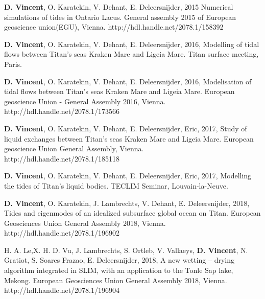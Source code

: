 \begin{list}{}{%
\setlength{\topsep}{0pt}%
\setlength{\leftmargin}{0.23in}%
\setlength{\listparindent}{-0.23in}%
\setlength{\itemindent}{-0.23in}%
\setlength{\parsep}{\parskip}%
}%

\item \textbf{D. Vincent}, O. Karatekin, V. Dehant, E. Deleersnijder, 2015 Numerical simulations of tides in Ontario Lacus. General assembly 2015 of European geoscience union(EGU), Vienna. http://hdl.handle.net/2078.1/158392

\item \textbf{D. Vincent}, O. Karatekin, V. Dehant, E. Deleersnijder, 2016, Modelling of tidal flows between Titan's seas Kraken Mare and Ligeia Mare. Titan surface meeting, Paris.

\item \textbf{D. Vincent}, O. Karatekin, V. Dehant, E. Deleersnijder, 2016, Modelisation of tidal flows between Titan's seas Kraken Mare and Ligeia Mare. European geoscience Union - General Assembly 2016, Vienna.\\
http://hdl.handle.net/2078.1/173566

\item \textbf{D. Vincent}, O. Karatekin, V. Dehant, E. Deleersnijder, Eric, 2017, Study of liquid exchanges between Titan's seas Kraken Mare and Ligeia Mare. European geoscience Union General Assembly, Vienna. \\
http://hdl.handle.net/2078.1/185118

\item \textbf{D. Vincent}, O. Karatekin, V. Dehant, E. Deleersnijder, Eric, 2017, Modelling the tides of Titan's liquid bodies. TECLIM Seminar, Louvain-la-Neuve.

\item \textbf{D. Vincent}, O. Karatekin, J. Lambrechts, V. Dehant, E. Deleersnijder, 2018, Tides and eigenmodes of an idealized subsurface global ocean on Titan. European Geosciences Union General Assembly 2018, Vienna. \\
http://hdl.handle.net/2078.1/196902

\item H. A. Le,X. H. D. Vu, J. Lambrechts, S. Ortleb, V. Vallaeys, \textbf{D. Vincent}, N. Gratiot, S. Soares Frazao, E. Deleersnijder, 2018, A new wetting – drying algorithm integrated in SLIM, with an application to the Tonle Sap lake, Mekong. European Geosciences Union General Assembly 2018, Vienna. http://hdl.handle.net/2078.1/196904







\end{list}